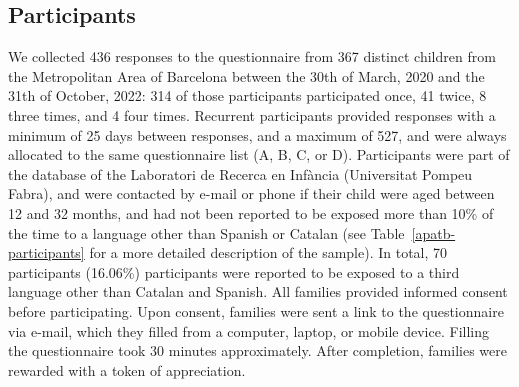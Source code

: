 \documentclass[
  man,
  floatsintext,
  colorlinks=true,linkcolor=blue,citecolor=blue,urlcolor=blue,biblatex]{apa7}
\begin{document}
\hypertarget{sec-participants}{%
\subsection{Participants}\label{sec-participants}}

We collected 436 responses to the questionnaire from 367 distinct
children from the Metropolitan Area of Barcelona between the 30th of
March, 2020 and the 31th of October, 2022: 314 of those participants
participated once, 41 twice, 8 three times, and 4 four times. Recurrent
participants provided responses with a minimum of 25 days between
responses, and a maximum of 527, and were always allocated to the same
questionnaire list (A, B, C, or D). Participants were part of the
database of the Laboratori de Recerca en Infància (Universitat Pompeu
Fabra), and were contacted by e-mail or phone if their child were aged
between 12 and 32 months, and had not been reported to be exposed more
than 10\% of the time to a language other than Spanish or Catalan (see
Table~\ref{apatb-participants} for a more detailed description of the
sample). In total, 70 participants (16.06\%) participants were reported
to be exposed to a third language other than Catalan and Spanish. All
families provided informed consent before participating. Upon consent,
families were sent a link to the questionnaire via e-mail, which they
filled from a computer, laptop, or mobile device. Filling the
questionnaire took 30 minutes approximately. After completion, families
were rewarded with a token of appreciation.
\end{document}
